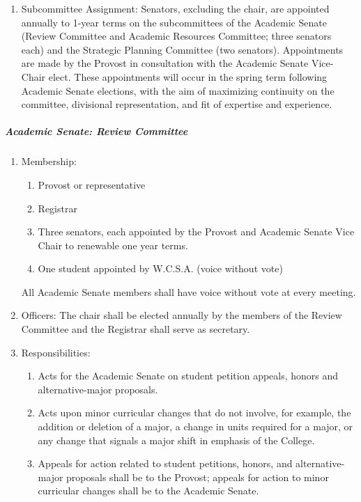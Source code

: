 \documentclass[letterpaper, 11pt]{article}
\begin{document}
\begin{enumerate}[label=\alph*)]
						\item{Subcommittee Assignment:  Senators, excluding the chair, are appointed annually to 1-year terms on the subcommittees of the Academic Senate (Review Committee and Academic Resources Committee; three senators each) and the Strategic Planning Committee (two senators).  Appointments are made by the Provost in consultation with the Academic Senate Vice-Chair elect.  These appointments will occur in the spring term following Academic Senate elections, with the aim of maximizing continuity on the committee, divisional representation, and fit of expertise and experience.}
					\end{enumerate}
				\subparagraph{Academic Senate:  Review Committee}
					\begin{enumerate}[label=\alph*)]
						\item{Membership:
							\begin{enumerate}[label=\arabic*)]
								\item{Provost or representative}
								\item{Registrar}
								\item{Three senators, each appointed by the Provost and Academic Senate Vice Chair to renewable one year terms.}
								\item{One student appointed by W.C.S.A. (voice without vote)}
							\end{enumerate}
							All Academic Senate members shall have voice without vote at every meeting.
						}
						\item{Officers:
							The chair shall be elected annually by the members of the Review Committee and the Registrar shall serve as secretary.
						}
						\item{Responsibilities:
							\begin{enumerate}[label=\arabic*)]
								\item{Acts for the Academic Senate on student petition appeals, honors and alternative-major proposals.}
								\item{Acts upon minor curricular changes that do not involve, for example, the addition or deletion of a major, a change in units required for a major, or any change that signals a major shift in emphasis of the College.}
								\item{Appeals for action related to student petitions, honors, and alternative-major proposals shall be to the Provost; appeals for action to minor curricular changes shall be to the Academic Senate.}
							\end{enumerate}
						}
					\end{enumerate}
\end{document}
